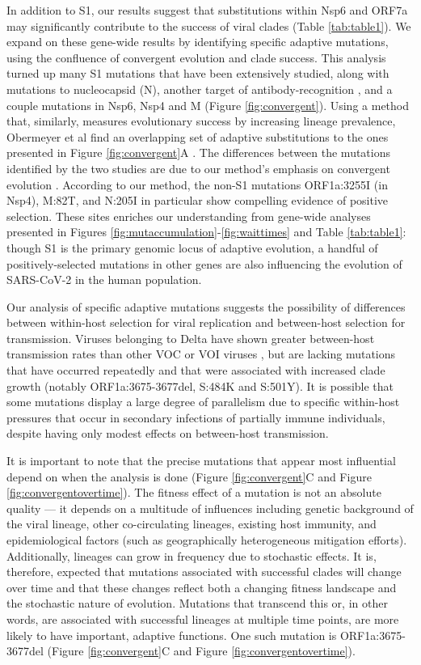 \documentclass[11pt,oneside,letterpaper]{article}
\begin{document}
In addition to S1, our results suggest that substitutions within Nsp6 and ORF7a may significantly contribute to the success of viral clades (Table \ref{tab:table1}).
We expand on these gene-wide results by identifying specific adaptive mutations, using the confluence of convergent evolution and clade success.
This analysis turned up many S1 mutations that have been extensively studied, along with mutations to nucleocapsid (N), another target of antibody-recognition \cite{Kang2021-pe}, and a couple mutations in Nsp6, Nsp4 and M (Figure \ref{fig:convergent}).
Using a method that, similarly, measures evolutionary success by increasing lineage prevalence, Obermeyer et al find an overlapping set of adaptive substitutions to the ones presented in Figure \ref{fig:convergent}A \cite{Obermeyer2021-fk}.
The differences between the mutations identified by the two studies are due to our method's emphasis on convergent evolution \cite{Obermeyer2021-fk}.
According to our method, the non-S1 mutations ORF1a:3255I (in Nsp4), M:82T, and N:205I in particular show compelling evidence of positive selection.
These sites enriches our understanding from gene-wide analyses presented in Figures \ref{fig:mutaccumulation}-\ref{fig:waittimes} and Table \ref{tab:table1}: though S1 is the primary genomic locus of adaptive evolution, a handful of positively-selected mutations in other genes are also influencing the evolution of SARS-CoV-2 in the human population.

Our analysis of specific adaptive mutations suggests the possibility of differences between within-host selection for viral replication and between-host selection for transmission.
Viruses belonging to Delta have shown greater between-host transmission rates than other VOC or VOI viruses \cite{Campbell2021-cx}, but are lacking mutations that have occurred repeatedly and that were associated with increased clade growth (notably ORF1a:3675-3677del, S:484K and S:501Y).
It is possible that some mutations display a large degree of parallelism due to specific within-host pressures that occur in secondary infections of partially immune individuals, despite having only modest effects on between-host transmission.

It is important to note that the precise mutations that appear most influential depend on when the analysis is done (Figure \ref{fig:convergent}C and Figure \ref{fig:convergentovertime}).
The fitness effect of a mutation is not an absolute quality --- it depends on a multitude of influences including genetic background of the viral lineage, other co-circulating lineages, existing host immunity, and epidemiological factors (such as geographically heterogeneous mitigation efforts).
Additionally, lineages can grow in frequency due to stochastic effects.
It is, therefore, expected that mutations associated with successful clades will change over time and that these changes reflect both a changing fitness landscape and the stochastic nature of evolution.
Mutations that transcend this or, in other words, are associated with successful lineages at multiple time points, are more likely to have important, adaptive functions.
One such mutation is ORF1a:3675-3677del (Figure \ref{fig:convergent}C and Figure \ref{fig:convergentovertime}).
\end{document}
